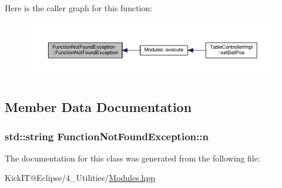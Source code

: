 Here is the caller graph for this function\+:\nopagebreak
\begin{figure}[H]
\begin{center}
\leavevmode
\includegraphics[width=350pt]{class_function_not_found_exception_a7c0198d24a9f7d74d5e74c9872e6ee09_icgraph}
\end{center}
\end{figure}




\subsection{Member Data Documentation}
\subsubsection[{\texorpdfstring{n}{n}}]{\setlength{\rightskip}{0pt plus 5cm}std\+::string Function\+Not\+Found\+Exception\+::n\hspace{0.3cm}{\ttfamily [protected]}}\hypertarget{class_function_not_found_exception_af2547016caeac6ac3dd21f0ca070c6af}{}\label{class_function_not_found_exception_af2547016caeac6ac3dd21f0ca070c6af}


The documentation for this class was generated from the following file\+:\begin{DoxyCompactItemize}
\item 
Kick\+I\+T@\+Eclipse/4\+\_\+\+Utilities/\hyperlink{_modules_8hpp}{Modules.\+hpp}\end{DoxyCompactItemize}
